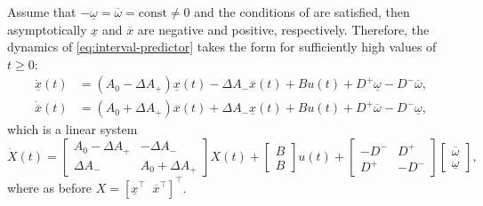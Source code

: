 \begin{remark}
	\begin{leftbar}[remarkbar]
	Assume that $-\underline{\omega}=\overline{\omega}=\text{const}\ne0$ and the conditions of  are satisfied, then asymptotically $\underline{x}$ and $\overline{x}$ are negative and positive, respectively. Therefore, the dynamics of \eqref{eq:interval-predictor} takes the form for sufficiently high values of $t\geq0$:
	\begin{align*}
		\dot{\underline{x}}(t) & = (A_{0}-\Delta A_{+})\underline{x}(t)-\Delta A_{-}\overline{x}(t) +Bu(t) +D^{+}\underline{\omega}-D^{-}\overline{\omega},\\
		\dot{\overline{x}}(t) & = (A_{0}+\Delta A_{+})\overline{x}(t)+\Delta A_{-}\underline{x}(t)  +Bu(t) +D^{+}\overline{\omega}-D^{-}\underline{\omega},
	\end{align*}
	which is a linear system
	\begin{equation}
	\label{eq:linear-asympt}
	\dot{X}(t) = \left[\begin{array}{cc}
	A_{0}-\Delta A_{+} & -\Delta A_{-}\\
	\Delta A_{-} & A_{0}+\Delta A_{+}
	\end{array}\right]X(t) + \begin{bmatrix}B \\ B\end{bmatrix} u(t) +\left[\begin{array}{cc}
	-D^{-} & D^{+}\\
	D^{+} & -D^{-}
	\end{array}\right]\left[\begin{array}{c}
	\overline{\omega}\\
	\underline{\omega}
	\end{array}\right],
	\end{equation}
	where as before $X=[\underline{x}^{\top}\;\;\overline{x}^{\top}]^{\top}$.
	\end{leftbar}
\end{remark}
